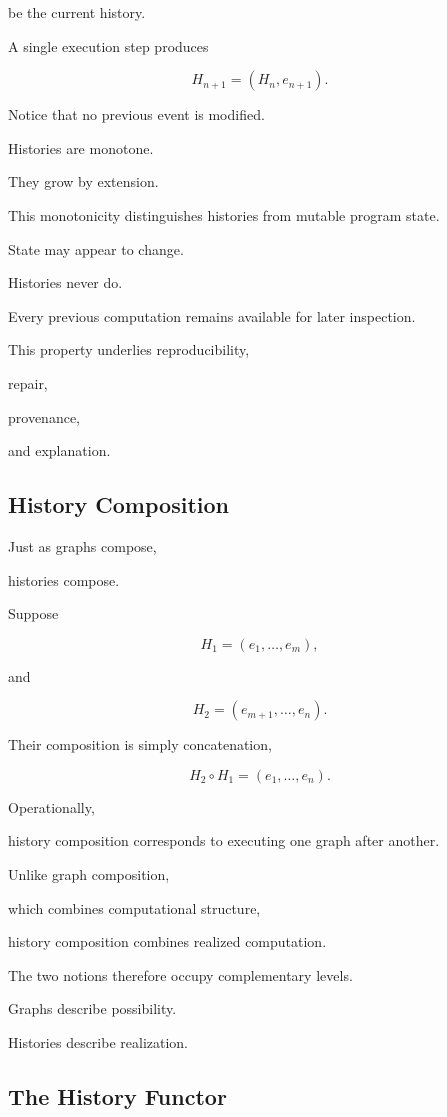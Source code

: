 \documentclass[12pt,oneside]{article}
\begin{document}
be the current history.

A single execution step produces

\[
H_{n+1}
=
(H_n,e_{n+1}).
\]

Notice that no previous event is modified.

Histories are monotone.

They grow by extension.

This monotonicity distinguishes histories from mutable program state.

State may appear to change.

Histories never do.

Every previous computation remains available for later inspection.

This property underlies reproducibility,

repair,

provenance,

and explanation.

\subsection{History Composition}

Just as graphs compose,

histories compose.

Suppose

\[
H_1
=
(e_1,\ldots,e_m),
\]

and

\[
H_2
=
(e_{m+1},\ldots,e_n).
\]

Their composition is simply concatenation,

\[
H_2\circ H_1
=
(e_1,\ldots,e_n).
\]

Operationally,

history composition corresponds to executing one graph after another.

Unlike graph composition,

which combines computational structure,

history composition combines realized computation.

The two notions therefore occupy complementary levels.

Graphs describe possibility.

Histories describe realization.

\subsection{The History Functor}
\end{document}
